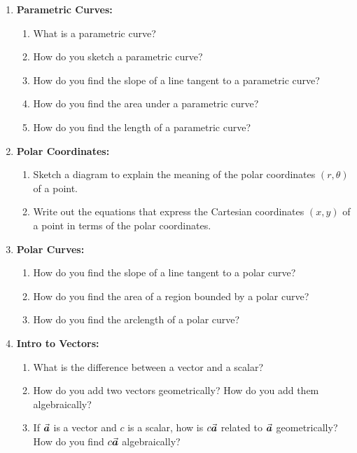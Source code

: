 \begin{enumerate}

\item \textbf{Parametric Curves:}
\begin{enumerate}
\item What is a parametric curve?
\item How do you sketch a parametric curve?
\item How do you find the slope of a line tangent to a parametric curve?
\item How do you find the area under a parametric curve?
\item How do you find the length of a parametric curve?
\end{enumerate}


\item \textbf{Polar Coordinates:}
\begin{enumerate}
\item Sketch a diagram to explain the meaning of the polar coordinates \((r,\theta)\) of a point.
\item Write out the equations that express the Cartesian coordinates \((x,y)\) of a point in terms of the polar coordinates.
\end{enumerate}

\item \textbf{Polar Curves:}
\begin{enumerate}
\item How do you find the slope of a line tangent to a polar curve?
\item How do you find the area of a region bounded by a polar curve?
\item How do you find the arclength of a polar curve?
\end{enumerate}


\item \textbf{Intro to Vectors:}
\begin{enumerate}
\item What is the difference between a vector and a scalar?
\item How do you add two vectors geometrically? How do you add them algebraically?
\item If \(\a\) is a vector and \(c\) is a scalar, how is \(c\a\) related to \(\a\) geometrically? How do you find \(c\a\) algebraically?
\end{enumerate}


\end{enumerate}
